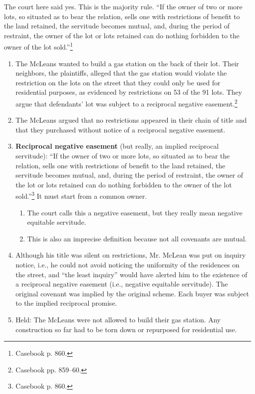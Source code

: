 The court here said yes. This is the majority rule. ``If the owner of two or 
more lots, so situated as to bear the relation, sells one with restrictions of 
benefit to the land retained, the servitude becomes mutual, and, during the 
period of restraint, the owner of the lot or lots retained can do nothing 
forbidden to the owner of the lot sold.''\footnote{Casebook p.  860.}

\begin{enumerate}
    \item The McLeans wanted to build a gas station on the back of their lot. 
    Their neighbors, the plaintiffs, alleged that the gas station would 
    violate the restriction on the lots on the street that they could only be 
    used for residential purposes, as evidenced by restrictions on 53 of the 
    91 lots. They argue that defendants' lot was subject to a reciprocal 
    negative easement.\footnote{Casebook pp. 859--60.}
    \item The McLeans argued that no restrictions appeared in their chain of 
    title and that they purchased without notice of a reciprocal negative 
    easement.
    \item \textbf{Reciprocal negative easement} (but really, an implied 
    reciprocal servitude): ``If the owner of two or more lots, so situated as 
    to bear the relation, sells one with restrictions of benefit to the land 
    retained, the servitude becomes mutual, and, during the period of 
    restraint, the owner of the lot or lots retained can do nothing forbidden 
    to the owner of the lot sold.''\footnote{Casebook p.  860.} It must start 
    from a common owner.
    \begin{enumerate}
        \item The court calls this a negative easement, but they really mean 
        negative equitable servitude.
        \item This is also an imprecise definition because not all covenants 
        are mutual.
    \end{enumerate}
    \item Although his title was silent on restrictions, Mr. McLean was put on 
    inquiry notice, i.e., he could not avoid noticing the uniformity of the 
    residences on the street, and ``the least inquiry'' would have alerted him 
    to the existence of a reciprocal negative easement (i.e., negative 
    equitable servitude). The original covenant was implied by the original 
    scheme. Each buyer was subject to the implied reciprocal promise.
    \item Held: The McLeans were not allowed to build their gas station. Any 
    construction so far had to be torn down or repurposed for residential use.
\end{enumerate}

